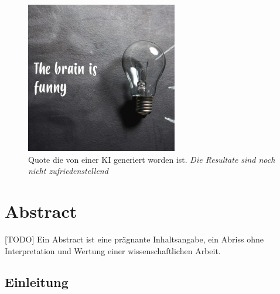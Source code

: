 \documentclass{thesisclass}
\begin{document}



\frontmatter
{}

\blankpage

\blankpage

\vspace*{\fill}
\begin{figure}[h]
  \center
  \includegraphics[width=250px]{images/inspirobotQuote.jpg}
  \caption{Quote die von einer \gls{KI} generiert worden ist. \textit{Die Resultate sind noch nicht zufriedenstellend} \cite{inspirobot}}
  \label{fig:Inspirational quote by AI}
\end{figure}
\vspace*{\fill}\clearpage

\tableofcontents
\cleardoublepage

%




\chapter{Abstract}
[TODO] Ein Abstract ist eine prägnante Inhaltsangabe, ein Abriss ohne Interpretation und Wertung einer wissenschaftlichen Arbeit.
\newpage

\section{\textbf{Einleitung}}
\end{document}
